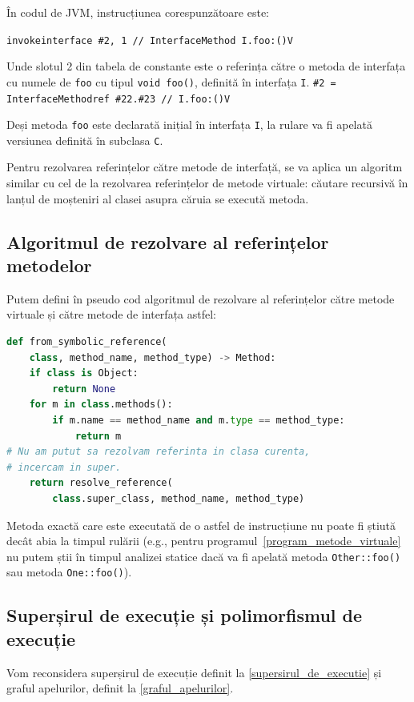 În codul de JVM, instrucțiunea corespunzătoare este:

\texttt{invokeinterface \#2,  1            // InterfaceMethod I.foo:()V}

Unde slotul 2 din tabela de constante este o referința către o metoda de
interfața cu numele de \texttt{foo} cu tipul \texttt{void foo()}, definită în
interfața \texttt{I}.
\texttt{\#2 = InterfaceMethodref \#22.\#23        // I.foo:()V}

Deși metoda \texttt{foo} este declarată inițial în interfața \texttt{I}, la
rulare va fi apelată versiunea definită în subclasa \texttt{C}.

Pentru rezolvarea referințelor către metode de interfață, se va aplica un algoritm similar cu
cel de la rezolvarea referințelor de metode virtuale: căutare recursivă în
lanțul de moșteniri al clasei asupra căruia se execută metoda.

\subsection{Algoritmul de rezolvare al referințelor metodelor}

Putem defini în pseudo cod algoritmul de rezolvare al referințelor către metode
virtuale și către metode de interfața astfel:

\begin{lstlisting}[language=Python, label=from_symbolic_reference]
def from_symbolic_reference(
    class, method_name, method_type) -> Method:
    if class is Object:
        return None
    for m in class.methods():
        if m.name == method_name and m.type == method_type:
            return m
# Nu am putut sa rezolvam referinta in clasa curenta,
# incercam in super.
    return resolve_reference(
        class.super_class, method_name, method_type)
\end{lstlisting}

Metoda exactă care este executată de o astfel de instrucțiune nu poate fi știută
decât abia la timpul rulării (e.g., pentru programul~\ref{program_metode_virtuale}
nu putem știi în timpul analizei statice dacă va fi apelată metoda
\texttt{Other::foo()} sau metoda \texttt{One::foo()}).

\subsection{Superșirul de execuție și polimorfismul de execuție}

Vom reconsidera superșirul de execuție definit la \ref{supersirul_de_executie}
și graful apelurilor, definit la \ref{graful_apelurilor}.

